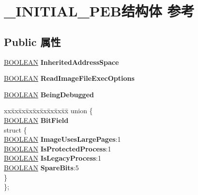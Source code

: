 \hypertarget{struct___i_n_i_t_i_a_l___p_e_b}{}\section{\+\_\+\+I\+N\+I\+T\+I\+A\+L\+\_\+\+P\+E\+B结构体 参考}
\label{struct___i_n_i_t_i_a_l___p_e_b}
\subsection*{Public 属性}
\begin{DoxyCompactItemize}
\item 
\mbox{\label{struct___i_n_i_t_i_a_l___p_e_b_a46e7791df2fec076db10574cfb33b335}} 
\hyperlink{_processor_bind_8h_a112e3146cb38b6ee95e64d85842e380a}{B\+O\+O\+L\+E\+AN} {\bfseries Inherited\+Address\+Space}
\item 
\mbox{\label{struct___i_n_i_t_i_a_l___p_e_b_a50eabfa371dafcf90519da3e3510c9ca}} 
\hyperlink{_processor_bind_8h_a112e3146cb38b6ee95e64d85842e380a}{B\+O\+O\+L\+E\+AN} {\bfseries Read\+Image\+File\+Exec\+Options}
\item 
\mbox{\label{struct___i_n_i_t_i_a_l___p_e_b_a66ac7615cde5b05a5d1fefb85096b4f7}} 
\hyperlink{_processor_bind_8h_a112e3146cb38b6ee95e64d85842e380a}{B\+O\+O\+L\+E\+AN} {\bfseries Being\+Debugged}
\item 
\mbox{\label{struct___i_n_i_t_i_a_l___p_e_b_ad949817b1ac01ea0bf3b28c23ecd9d6f}} 
\begin{tabbing}
xx\=xx\=xx\=xx\=xx\=xx\=xx\=xx\=xx\=\kill
union \{\\
\>\hyperlink{_processor_bind_8h_a112e3146cb38b6ee95e64d85842e380a}{BOOLEAN} {\bfseries BitField}\\
\mbox{\label{union___i_n_i_t_i_a_l___p_e_b_1_1_0D2201_a8b3d439290a018df629b4bf42766b32b}} 
\>struct \{\\
\>\>\hyperlink{_processor_bind_8h_a112e3146cb38b6ee95e64d85842e380a}{BOOLEAN} {\bfseries ImageUsesLargePages}:1\\
\>\>\hyperlink{_processor_bind_8h_a112e3146cb38b6ee95e64d85842e380a}{BOOLEAN} {\bfseries IsProtectedProcess}:1\\
\>\>\hyperlink{_processor_bind_8h_a112e3146cb38b6ee95e64d85842e380a}{BOOLEAN} {\bfseries IsLegacyProcess}:1\\
\>\>\hyperlink{_processor_bind_8h_a112e3146cb38b6ee95e64d85842e380a}{BOOLEAN} {\bfseries SpareBits}:5\\
\>\} \\
\}; \\


\end{tabbing}
\end{DoxyCompactItemize}
